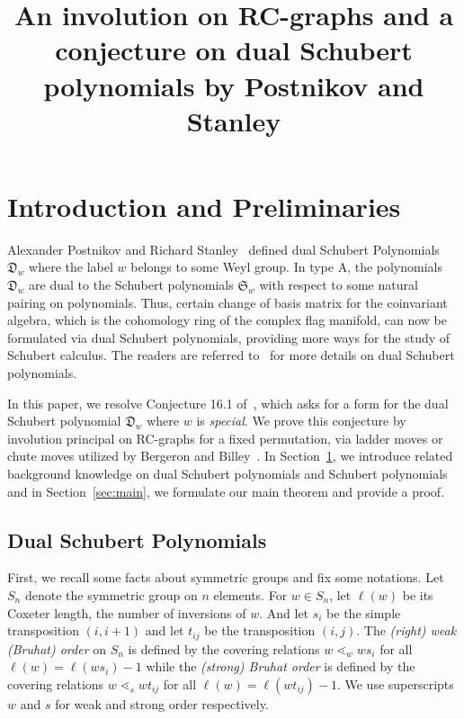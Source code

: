 \documentclass[ALCO,ThmDefs,Unicode,epreuves]{cedram}
\author[\initial{Y.} Gao]{\firstname{Yibo} \lastname{Gao}}
\title
[On a Conjecture by Postnikov and Stanley]
{An involution on RC-graphs and a conjecture on dual Schubert polynomials by Postnikov and Stanley}
\newcommand{\D}{\mathfrak{D}}
\begin{document}
\maketitle

\section{Introduction and Preliminaries}\label{sec:intro}
Alexander Postnikov and Richard Stanley~\cite{postnikov2009chains} defined dual Schubert Polynomials $\D_w$ where the label $w$ belongs to some Weyl group. In type A, the polynomials $\D_w$ are dual to the Schubert polynomials $\mathfrak{S}_w$ with respect to some natural pairing on polynomials. Thus, certain change of basis matrix for the coinvariant algebra, which is the cohomology ring of the complex flag manifold, can now be formulated via dual Schubert polynomials, providing more ways for the study of Schubert calculus. The readers are referred to~\cite{postnikov2009chains} for more details on dual Schubert polynomials.

In this paper, we resolve Conjecture 16.1 of~\cite{postnikov2009chains}, which asks for a form for the dual Schubert polynomial $\D_w$ where $w$ is \emph{special}. We prove this conjecture by involution principal on RC-graphs for a fixed permutation, via ladder moves or chute moves utilized by Bergeron and Billey~\cite{bergeron1993rc}. In Section~\ref{sec:intro}, we introduce related background knowledge on dual Schubert polynomials and Schubert polynomials and in Section~\ref{sec:main}, we formulate our main theorem and provide a proof. 


\subsection{Dual Schubert Polynomials}

First, we recall some facts about symmetric groups and fix some notations. Let $S_n$ denote the symmetric group on $n$ elements. For $w\in S_n$, let $\ell(w)$ be its Coxeter length, \ie the number of inversions of $w$. And let $s_i$ be the simple transposition $(i,i+1)$ and let $t_{ij}$ be the transposition $(i,j)$. The \emph{(right) weak (Bruhat) order} on $S_n$ is defined by the covering relations $w\lessdot_w ws_i$ for all $\ell(w)=\ell(ws_i)-1$ while the \emph{(strong) Bruhat order} is defined by the covering relations $w\lessdot_s wt_{ij}$ for all $\ell(w)=\ell(wt_{ij})-1$. We use superscripts $w$ and $s$ for weak and strong order respectively. 
\end{document}
